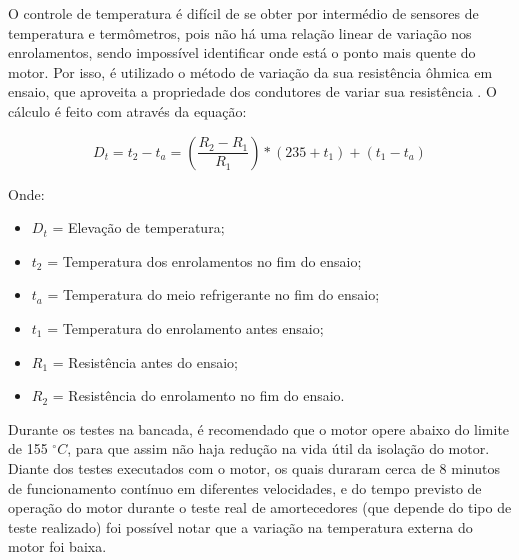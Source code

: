 		O controle de temperatura é difícil de se obter por intermédio de sensores de temperatura e termômetros, pois não há uma relação linear de variação nos enrolamentos, sendo impossível identificar onde está o ponto mais quente do motor. Por isso, é utilizado o método de variação da sua resistência ôhmica em ensaio, que aproveita a propriedade dos condutores de variar sua resistência \cite{WEG05}. O cálculo é feito com através da equação:

		$$ D_{t} = t_{2} - t_{a} = (\frac{R_{2} - R_{1}}{R_{1}}) * (235 + t_{1}) + (t_{1} - t_{a}) $$

		Onde:
		\begin{itemize}
			\item $D_{t}$ = Elevação de temperatura;
			\item $t_{2}$ = Temperatura dos enrolamentos no fim do ensaio;
			\item $t_{a}$ = Temperatura do meio refrigerante no fim do ensaio;
			\item $t_{1}$ = Temperatura do enrolamento antes ensaio;
			\item $R_{1}$ = Resistência antes do ensaio;
			\item $R_{2}$ = Resistência do enrolamento no fim do ensaio.
		\end{itemize}

		Durante os testes na bancada, é recomendado que o motor opere abaixo do limite de 155 $^{\circ}C$, para que assim não haja redução na vida útil da isolação do motor. Diante dos testes executados com o motor, os quais duraram cerca de 8 minutos de funcionamento contínuo em diferentes velocidades, e do tempo previsto de operação do motor durante o teste real de amortecedores (que depende do tipo de teste realizado) foi possível notar que a variação na temperatura externa do motor foi baixa.  

